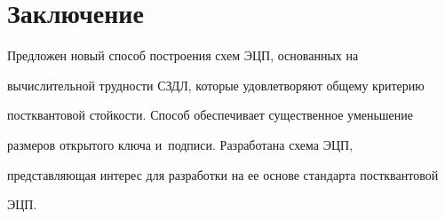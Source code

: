    


   


\section{Заключение}





  Предложен новый способ построения схем ЭЦП, основанных на 


вычислительной трудности СЗДЛ, которые удовлетворяют общему критерию 


постквантовой стойкости. Способ обеспечивает существенное уменьшение 


размеров открытого ключа и~подписи. Разработана схема ЭЦП, 


представляющая интерес для разработки на ее основе стандарта постквантовой 


ЭЦП. 


  


